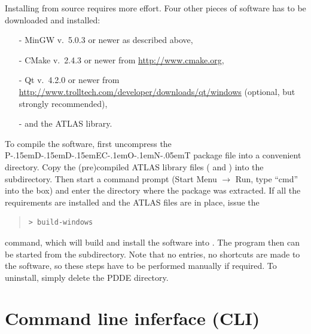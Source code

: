 \documentclass[10pt,a4paper]{ddedoc}
\def\pdde{{P\kern-.15emD\kern-.15emD\kern-.15emE\raisebox{.25ex}{-}C\kern-.1emO\kern-.1emN\kern-.05emT}}
\begin{document}
Installing from source requires more effort. Four other pieces of software has
to be downloaded and installed:
\begin{itemize}
\item[-] MinGW v.\ 5.0.3 or newer as described above,
\item[-] CMake v.\ 2.4.3 or newer from \url{http://www.cmake.org},
\item[-] Qt v.\ 4.2.0 or newer from
\url{http://www.trolltech.com/developer/downloads/qt/windows} (optional, but strongly recommended),
\item[-] and the ATLAS library.
\end{itemize}
To compile the software, first uncompress the \pdde{} package file
 into a convenient directory.
Copy the (pre)compiled ATLAS library files ( and
) into the  subdirectory.
Then start a command prompt (Start Menu $\rightarrow$ Run, type ``cmd'' into the
box) and enter the directory  where the package was
extracted. If all the requirements are installed and the ATLAS files are in
place, issue the
{ \small \begin{quote} \begin{lstlisting}[basicstyle=\tt,frame=single]
 > build-windows
\end{lstlisting} \end{quote} } \noindent
command, which will build and install the software into . The program then can be started from the 
subdirectory. Note that no  entries, no shortcuts are made to
the software, so these steps have to be performed manually if required. To
uninstall, simply delete the PDDE directory.

\section{Command line inferface (CLI)}
\end{document}
